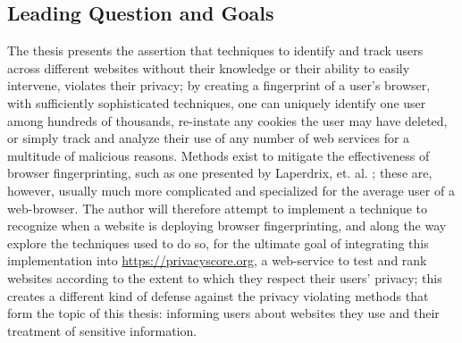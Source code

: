 \documentclass[a4paper, 12pt]{scrreprt}
\begin{document}
    \subsection{Leading Question and Goals}
    The thesis presents the assertion that techniques to identify and track users across different websites without
    their knowledge or their ability to easily intervene, violates their privacy; by creating a fingerprint
    of a user's browser, with sufficiently sophisticated techniques, one can uniquely identify one user
    among hundreds of thousands\cite{am_i_unique}, re-instate any cookies the user may have deleted,
    or simply track and analyze their use of any number of web services for a multitude of malicious reasons.\cite{eckersley2010unique}
    Methods exist to mitigate the effectiveness of browser fingerprinting, such as one presented by Laperdrix, et. al.
    \cite{laperdrix2015mitigating}; these are, however, usually much more complicated and specialized for
    the average user of a web-browser.
    The author will therefore attempt to implement a technique to recognize when a website is deploying browser fingerprinting,
    and along the way explore the techniques used to do so, for the ultimate goal of integrating this implementation into
    \url{https://privacyscore.org}, a web-service to test and rank websites according to the extent to which they
    respect their users' privacy; this creates a different kind of defense against the privacy violating
    methods that form the topic of this thesis: informing users about websites they use and their treatment of
    sensitive information.
\end{document}
